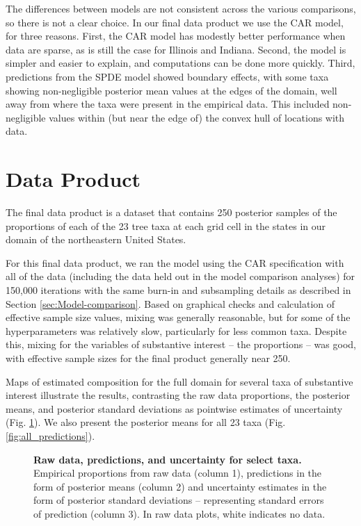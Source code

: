 \documentclass[10pt,letterpaper]{article}
\begin{document}
The differences between models are not consistent across the various
comparisons, so there is not a clear choice. In our final data product
we use the CAR model, for three reasons. First, the CAR model has
modestly better performance when data are sparse, as is still the
case for Illinois and Indiana. Second, the model is simpler and easier
to explain, and computations can be done more quickly. Third, predictions
from the SPDE model showed boundary effects, with some taxa showing
non-negligible posterior mean values at the edges of the domain, well
away from where the taxa were present in the empirical data. This
included non-negligible values within (but near the edge of) the convex
hull of locations with data. 





\section*{Data Product\label{sec:Data-product}}

The final data product is a dataset that contains 250 posterior samples
of the proportions of each of the 23 tree taxa at each grid cell in
the states in our domain of the northeastern United States.

For this final data product, we ran the model using the CAR specification
with all of the data (including the data held out
in the model comparison analyses) for 150,000 iterations with the
same burn-in and subsampling details as described in Section \ref{sec:Model-comparison}.
Based on graphical checks and calculation of effective sample size
values, mixing was generally reasonable, but for some of the hyperparameters
was relatively slow, particularly for less common taxa. Despite this,
mixing for the variables of substantive interest -- the proportions
-- was good, with effective sample sizes for the final product generally
near 250.

Maps of estimated composition for the full domain for several taxa
of substantive interest illustrate the results, contrasting the raw
data proportions, the posterior means, and posterior standard deviations
as pointwise estimates of uncertainty (Fig. \ref{fig:select_maps}).
We also present the posterior means for all 23 taxa (Fig. \ref{fig:all_predictions}).


\begin{figure}


\caption{{\bf Raw data, predictions, and uncertainty for select taxa.} 
\\Empirical proportions from raw data (column 1), predictions in the
form of posterior means (column 2) and uncertainty estimates in the
form of posterior standard deviations -- representing standard errors
of prediction (column 3). In raw data plots, white indicates no data.}
\label{fig:select_maps}
\end{figure}
\end{document}
